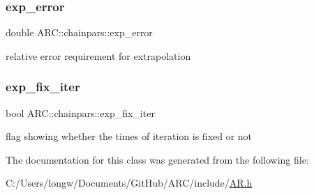 \subsubsection{\texorpdfstring{exp\+\_\+error}{exp\_error}}
{\footnotesize\ttfamily double A\+R\+C\+::chainpars\+::exp\+\_\+error}



relative error requirement for extrapolation 

\hypertarget{classARC_1_1chainpars_a3f16e6ea9497e294265c4a17df0394ba}{}\label{classARC_1_1chainpars_a3f16e6ea9497e294265c4a17df0394ba} 
\subsubsection{\texorpdfstring{exp\+\_\+fix\+\_\+iter}{exp\_fix\_iter}}
{\footnotesize\ttfamily bool A\+R\+C\+::chainpars\+::exp\+\_\+fix\+\_\+iter}



flag showing whether the times of iteration is fixed or not 



The documentation for this class was generated from the following file\+:\begin{DoxyCompactItemize}
\item 
C\+:/\+Users/longw/\+Documents/\+Git\+Hub/\+A\+R\+C/include/\hyperlink{AR_8h}{A\+R.\+h}\end{DoxyCompactItemize}
